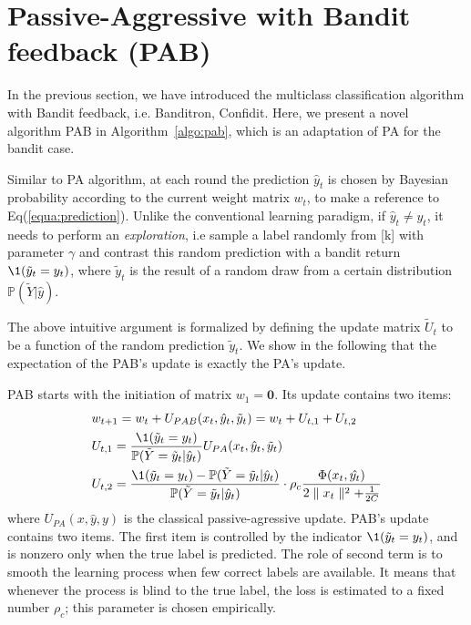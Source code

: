\section{Passive-Aggressive with Bandit feedback (PAB)}
In the previous section, we have introduced the multiclass classification algorithm with Bandit feedback, i.e. Banditron, Confidit. Here, we present a novel algorithm PAB\cite{zhong2015esann} in Algorithm~\ref{algo:pab}, which is an adaptation of PA for the bandit case. 

Similar to PA algorithm, at each round the prediction $\hat{y}_t$ is chosen by Bayesian 
probability according to the current weight matrix $w_t$, to make a reference to Eq(\ref{equa:prediction}).
Unlike the conventional learning paradigm, if $\hat{y}_t \neq y_t$, it needs to perform an \emph{exploration}, i.e sample a label 
randomly from [k] with parameter $\gamma$ and contrast this random prediction with a bandit return $\1(\tilde{y}_t=y_t)$, 
where $\tilde{y}_t$ is the result of a random draw from a certain distribution $\mathbb{P}(\tilde{Y}|\hat{y})$.

The above intuitive argument is formalized by defining the update 
matrix $\tilde{U}_t$ to be a function of the random prediction $\tilde{y}_t$. We  show in the following 
that the expectation of the PAB's update is exactly the PA's update.

PAB starts with the initiation of matrix $w_1 = \boldsymbol{0}$. Its update contains two items:
\begin{equation}\label{eq:PAB}
\begin{split}
&w_{t+1}=w_t+U_{PAB}(x_t,\hat{y}_t,\tilde{y}_t) = w_t + U_{t,1} + U_{t,2}\\
&U_{t,1} =\frac{\1(\tilde{y}_t = y_t)}{\mathbb{P}(\tilde{Y}=\tilde{y}_t|\hat{y}_t)}U_{PA}(x_t,\hat{y}_t,\tilde{y}_t) \\
&U_{t,2} =\frac{\1(\tilde{y}_t = y_t)- \mathbb{P}(\tilde{Y} =\tilde{y}_t|\hat{y}_t)}{\mathbb{P}(\tilde{Y}=\tilde{y}_t|\hat{y}_t)}\cdot \rho_c \frac{\Phi(x_t,\hat{y_t})}{2\parallel{x_t}\parallel^2+\frac{1}{2C}}\\
\end{split}
\end{equation}
where $U_{PA}(x,\hat{y},y)$ is the classical passive-agressive update. 
PAB's update contains two items. The first item is controlled by the indicator $\1(\tilde{y}_t=y_t)$, 
and is nonzero only when the true label is predicted. 
The role of second term is to smooth the learning process when few correct labels are available.
It means that whenever the process is blind to the true label, the loss is estimated to a fixed number $\rho_c$;
this parameter is chosen empirically.

